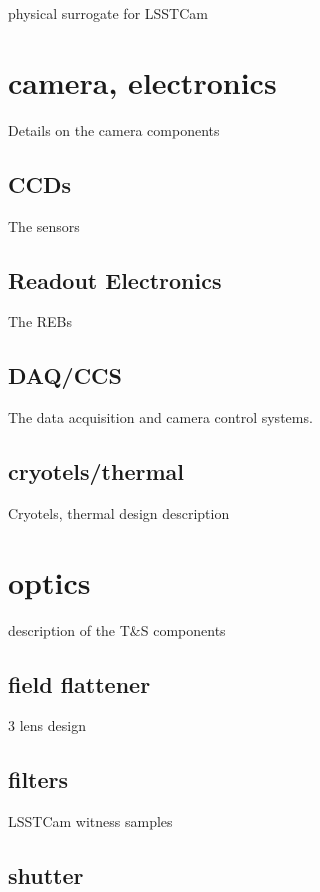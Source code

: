 \documentclass[modern]{aastex62}
\begin{document}
physical surrogate for LSSTCam


\section{camera, electronics}

Details on the camera components

\subsection{CCDs}

The sensors

\subsection{Readout Electronics}

The REBs

\subsection{DAQ/CCS}

The data acquisition and camera control systems.

\subsection{cryotels/thermal}

Cryotels, thermal design description

\section{optics}

description of the T&S components

\subsection{field flattener}

3 lens design

\subsection{filters}

LSSTCam witness samples

\subsection{shutter}
\end{document}

